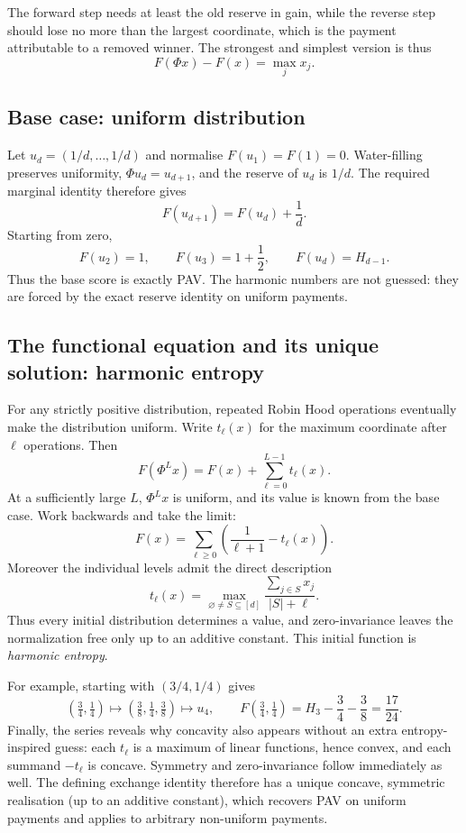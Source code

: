 \documentclass[11pt,a4paper]{article}
\theoremstyle{definition}
\theoremstyle{remark}
\begin{document}
The forward step needs at least the old reserve in gain, while the reverse step should lose no more than the largest coordinate, which is the payment attributable to a removed winner. The strongest and simplest version is thus
\[
\boxed{F(\Phi x)-F(x)=\max_jx_j.}
\]

\subsection{Base case: uniform distribution}
Let $u_d=(1/d,\ldots,1/d)$ and normalise $F(u_1)=F(1)=0$. Water-filling preserves uniformity, $\Phi u_d=u_{d+1}$, and the reserve of $u_d$ is $1/d$. The required marginal identity therefore gives
\[
F(u_{d+1})=F(u_d)+\frac1d.
\]
Starting from zero,
\[
F(u_2)=1,\qquad F(u_3)=1+\frac12,\qquad
\boxed{F(u_d)=H_{d-1}.}
\]
Thus the base score is exactly PAV. The harmonic numbers are not guessed: they are forced by the exact reserve identity on uniform payments.

\subsection{The functional equation and its unique solution: harmonic entropy}
For any strictly positive distribution, repeated Robin Hood operations eventually make the distribution uniform. Write $t_\ell(x)$ for the maximum coordinate after $\ell$ operations. Then
\[
F(\Phi^Lx)=F(x)+\sum_{\ell=0}^{L-1}t_\ell(x).
\]
At a sufficiently large $L$, $\Phi^Lx$ is uniform, and its value is known from the base case. Work backwards and take the limit:
\[
\boxed{F(x)=\sum_{\ell\ge0}\left(\frac1{\ell+1}-t_\ell(x)\right).}
\]
Moreover the individual levels admit the direct description
\[
t_\ell(x)=\max_{\varnothing\ne S\subseteq[d]}\frac{\sum_{j\in S}x_j}{|S|+\ell}.
\]
Thus every initial distribution determines a value, and zero-invariance leaves the normalization free only up to an additive constant. This initial function is \emph{harmonic entropy}.

For example, starting with $(3/4,1/4)$ gives
\[
(\tfrac34,\tfrac14)\longmapsto(\tfrac38,\tfrac14,\tfrac38)
\longmapsto u_4,\qquad
F(\tfrac34,\tfrac14)=H_3-\frac34-\frac38=\frac{17}{24}.
\]
Finally, the series reveals why concavity also appears without an extra entropy-inspired guess: each $t_\ell$ is a maximum of linear functions, hence convex, and each summand $-t_\ell$ is concave. Symmetry and zero-invariance follow immediately as well. The defining exchange identity therefore has a unique concave, symmetric realisation (up to an additive constant), which recovers PAV on uniform payments and applies to arbitrary non-uniform payments.
\end{document}
